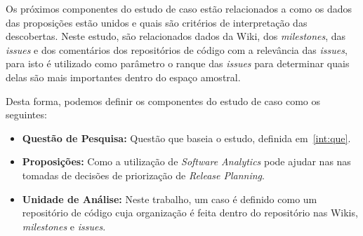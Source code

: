 Os próximos componentes do estudo de caso estão relacionados a como os dados das proposições estão unidos e quais são critérios de interpretação das descobertas. Neste estudo, são relacionados dados da Wiki, dos \textit{milestones}, das \textit{issues} e dos comentários dos repositórios de código com a relevância das \textit{issues}, para isto é utilizado como parâmetro o ranque das \textit{issues} para determinar quais delas 
são mais importantes dentro do espaço amostral.

Desta forma, podemos definir os componentes do estudo de caso como os seguintes:

\begin{itemize}
    \item \textbf{Questão de Pesquisa:} Questão que baseia o estudo, definida em~\ref{int:que}.
    \item \textbf{Proposições:} Como a utilização de \textit{Software Analytics} pode ajudar nas
    nas tomadas de decisões de priorização de \textit{Release Planning}.
    \item \textbf{Unidade de Análise:} Neste trabalho, um caso é definido como um repositório
        de código cuja organização é feita dentro do repositório nas Wikis, \textit{milestones}
        e \textit{issues}.
\end{itemize}

